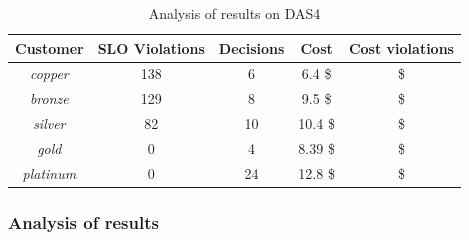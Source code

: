 \begin{table}
  {\scriptsize 
\begin{center}
    \begin{tabular}{  | c | c | c | c | c |}
    \hline
         \textbf{Customer}  & \textbf{SLO Violations} & \textbf{Decisions}  & \textbf{Cost}  & \textbf{Cost violations} \\ \hline
   \textit{copper}   & 138  &  6 &  6.4 \$ &  \$ \\ \hline   
   \textit{bronze}  &  129 &   8&  9.5 \$ &  \$ \\ \hline   
   \textit{silver}  &  82  & 10  &  10.4 \$ &   \$ \\ \hline   
   \textit{gold}  & 0  &  4  &   8.39 \$ &   \$ \\ \hline   
\textit{platinum} &  0 & 24 & 12.8 \$ &  \$ \\ \hline   

 \end{tabular}
\end{center}
\vspace{-5mm}
\caption{Analysis of results on DAS4}
\label{summaryDAS4}
}
\end{table}

\subsubsection{Analysis of results}
